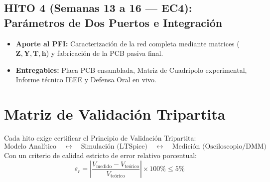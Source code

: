\documentclass[11pt, a4paper]{article}
\begin{document}
\subsection*{HITO 4 (Semanas 13 a 16 --- EC4): Parámetros de Dos Puertos e Integración}
\begin{itemize}
    \item \textbf{Aporte al PFI:} Caracterización de la red completa mediante matrices ($\mathbf{Z}, \mathbf{Y}, \mathbf{T}, \mathbf{h}$) y fabricación de la PCB pasiva final.
    \item \textbf{Entregables:} Placa PCB ensamblada, Matriz de Cuadripolo experimental, Informe técnico IEEE y Defensa Oral en vivo.
\end{itemize}

\section{Matriz de Validación Tripartita}
Cada hito exige certificar el Principio de Validación Tripartita:
\begin{equation*}
    \text{Modelo Analítico} \quad \longleftrightarrow \quad \text{Simulación (LTSpice)} \quad \longleftrightarrow \quad \text{Medición (Osciloscopio/DMM)}
\end{equation*}
Con un criterio de calidad estricto de error relativo porcentual:
\begin{equation}
    \varepsilon_r = \left\vert \frac{V_{\text{medido}} - V_{\text{teórico}}}{V_{\text{teórico}}} \right\vert \times 100\% \le 5\%
\end{equation}
\end{document}
